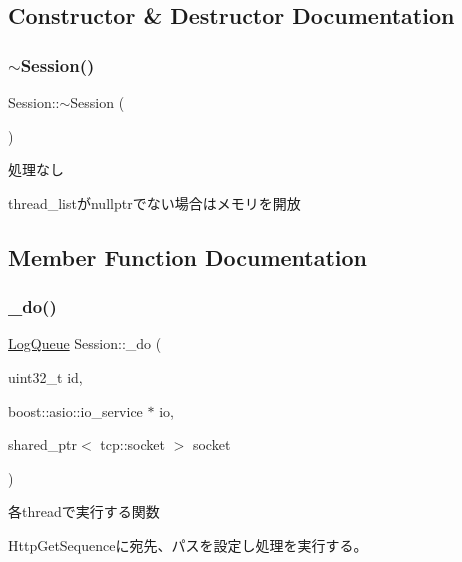 \subsection{Constructor \& Destructor Documentation}
\mbox{\label{class_session_a8753bb9dee966b7d39abc9b7237cd665}} 
\subsubsection{\texorpdfstring{$\sim$Session()}{~Session()}}
{\footnotesize\ttfamily Session\+::$\sim$\+Session (\begin{DoxyParamCaption}{ }\end{DoxyParamCaption})}



処理なし 

thread\+\_\+listがnullptrでない場合はメモリを開放 

\subsection{Member Function Documentation}
\mbox{\label{class_session_a1723417ecebdb373c736aedff685d401}} 
\subsubsection{\texorpdfstring{\_do()}{\_do()}}
{\footnotesize\ttfamily \mbox{\hyperlink{class_log_queue}{Log\+Queue}} Session\+::\+\_\+do (\begin{DoxyParamCaption}\item[{uint32\+\_\+t}]{id,  }\item[{boost\+::asio\+::io\+\_\+service $\ast$}]{io,  }\item[{shared\+\_\+ptr$<$ tcp\+::socket $>$}]{socket }\end{DoxyParamCaption})\hspace{0.3cm}{\ttfamily [private]}}



各threadで実行する関数 

Http\+Get\+Sequenceに宛先、パスを設定し処理を実行する。 \mbox{\label{class_session_ae2c389b0a37a29dfa05a55e6026b704d}} 

